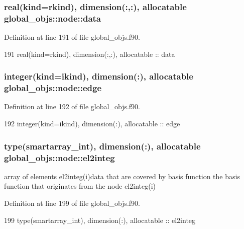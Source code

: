 \subsubsection[{data}]{\setlength{\rightskip}{0pt plus 5cm}real(kind=rkind), dimension(\+:,\+:), allocatable global\+\_\+objs\+::node\+::data}\label{structglobal__objs_1_1node_aef94abb820696071bf6636a7a57c104d}


Definition at line 191 of file global\+\_\+objs.\+f90.


\begin{DoxyCode}
191     \textcolor{keywordtype}{real(kind=rkind)}, \textcolor{keywordtype}{dimension(:,:)}, \textcolor{keywordtype}{allocatable}  :: data
\end{DoxyCode}
\subsubsection[{edge}]{\setlength{\rightskip}{0pt plus 5cm}integer(kind=ikind), dimension(\+:), allocatable global\+\_\+objs\+::node\+::edge}\label{structglobal__objs_1_1node_ab01cdcebe98c98eda1e43a6283111823}


Definition at line 192 of file global\+\_\+objs.\+f90.


\begin{DoxyCode}
192     \textcolor{keywordtype}{integer(kind=ikind)}, \textcolor{keywordtype}{dimension(:)}, \textcolor{keywordtype}{allocatable} :: edge
\end{DoxyCode}
\subsubsection[{el2integ}]{\setlength{\rightskip}{0pt plus 5cm}type({\bf smartarray\+\_\+int}), dimension(\+:), allocatable global\+\_\+objs\+::node\+::el2integ}\label{structglobal__objs_1_1node_a1cd2aa07b4e1ccd4e513b75d901d52d2}


array of elements el2integ(i)data that are covered by basis function the basis function that originates from the node el2integ(i) 



Definition at line 199 of file global\+\_\+objs.\+f90.


\begin{DoxyCode}
199     \textcolor{keywordtype}{type}(smartarray_int), \textcolor{keywordtype}{dimension(:)}, \textcolor{keywordtype}{allocatable} :: el2integ
\end{DoxyCode}
